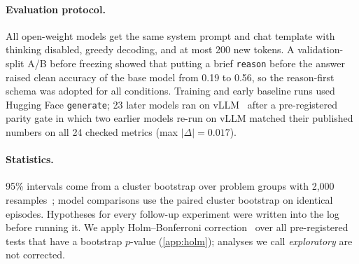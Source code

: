 \documentclass[11pt]{article}
\begin{document}
\paragraph{Evaluation protocol.} All open-weight models get the same system prompt and chat template with thinking
disabled, greedy decoding, and at most 200 new tokens. A validation-split A/B before freezing showed that putting a
brief \texttt{reason} before the answer raised clean accuracy of the base model from 0.19 to 0.56, so the
reason-first schema was adopted for all conditions. Training and early baseline runs used Hugging Face
\texttt{generate}; 23 later models ran on vLLM~\citep{kwon2023vllm} after a pre-registered parity gate in which two
earlier models re-run on vLLM matched their published numbers on all 24 checked metrics (max $|\Delta| = 0.017$).

\paragraph{Statistics.} 95\% intervals come from a cluster bootstrap over problem groups with 2,000
resamples~\citep{efron1993bootstrap}; model comparisons use the paired cluster bootstrap on identical episodes.
Hypotheses for every follow-up experiment were written into the log before running it. We apply Holm--Bonferroni
correction~\citep{holm1979simple} over all \nholmN{} pre-registered tests that have a bootstrap $p$-value
(\cref{app:holm}); analyses we call \emph{exploratory} are not corrected.
\end{document}

